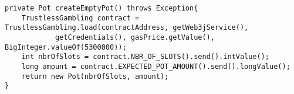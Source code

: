 \begin{lstlisting}[basicstyle=\small]
private Pot createEmptyPot() throws Exception{
    TrustlessGambling contract = TrustlessGambling.load(contractAddress, getWeb3jService(),
            getCredentials(), gasPrice.getValue(), BigInteger.valueOf(5300000));
    int nbrOfSlots = contract.NBR_OF_SLOTS().send().intValue();
    long amount = contract.EXPECTED_POT_AMOUNT().send().longValue();
    return new Pot(nbrOfSlots, amount);
}
\end{lstlisting}

